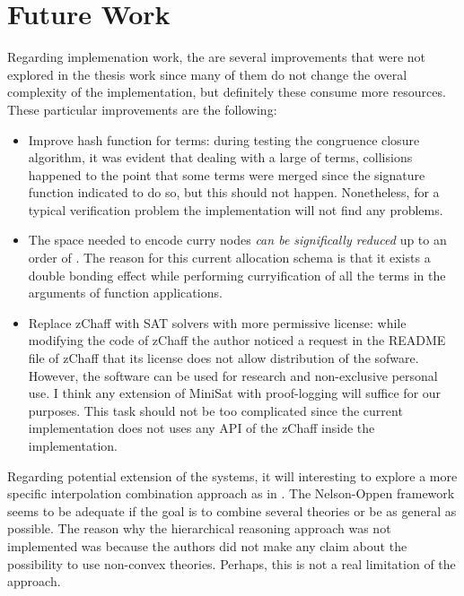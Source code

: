 \chapter{Future Work}

Regarding implemenation work, the are several improvements that were not explored 
in the thesis work since many of them do not change the overal complexity 
of the implementation, but definitely these consume more resources.
These particular improvements are the following:

\begin{itemize}
  \item Improve hash function for terms: during testing the congruence closure
    algorithm, it was evident that dealing with a large of terms, collisions
    happened  to the point that some terms were merged since the signature
    function indicated to do so, but this should not happen. Nonetheless, for
    a typical verification problem the implementation will not find any problems.
  \item The space needed to encode curry nodes \emph{can be significally reduced
    } up to an order of . The reason for this current allocation schema
    is that it exists a double bonding effect while performing curryification 
    of all the terms in the arguments of function applications.
  \item Replace zChaff with SAT solvers with more permissive license: while modifying
    the code of zChaff the author noticed a request in the README file of zChaff that
    its license does not allow distribution of the sofware. 
    However, the software can be used for research and non-exclusive
    personal use. I think any extension of MiniSat \cite{een03minisat} with proof-logging will
    suffice for our purposes. This task should not be too complicated since the
    current implementation does not uses any API of the zChaff inside the implementation.
\end{itemize}

Regarding potential extension of the systems, it will interesting to explore a
more specific interpolation combination approach as in \cite{10.1007/978-3-540-69738-1_25}.
The Nelson-Oppen framework seems to be adequate if the goal is to combine several theories
or be as general as possible. The reason why the hierarchical reasoning approach
was not implemented was because the authors did not make any claim about the possibility
to use non-convex theories. Perhaps, this is not a real limitation of the approach.

